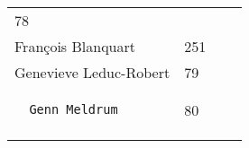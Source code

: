 \documentclass[]{article}
\begin{document}
\begin{longtable}[c]{@{}llll@{}}
\begin{minipage}[t]{0.10\columnwidth}
78
\end{minipage} & \begin{minipage}[t]{0.13\columnwidth}\raggedright
\end{minipage} & \begin{minipage}[t]{0.15\columnwidth}\raggedright
\end{minipage}
\\\noalign{\medskip}
\begin{minipage}[t]{0.39\columnwidth}\raggedright
Fran\c{c}ois Blanquart
\end{minipage} & \begin{minipage}[t]{0.10\columnwidth}\raggedright
251
\end{minipage} & \begin{minipage}[t]{0.13\columnwidth}\raggedright
\end{minipage} & \begin{minipage}[t]{0.15\columnwidth}\raggedright
\end{minipage}
\\\noalign{\medskip}
\begin{minipage}[t]{0.39\columnwidth}\raggedright
Genevieve Leduc-Robert
\end{minipage} & \begin{minipage}[t]{0.10\columnwidth}\raggedright
79
\end{minipage} & \begin{minipage}[t]{0.13\columnwidth}\raggedright
\end{minipage} & \begin{minipage}[t]{0.15\columnwidth}\raggedright
\end{minipage}
\\\noalign{\medskip}
\begin{minipage}[t]{0.39\columnwidth}\raggedright
\begin{verbatim}
  Genn Meldrum
\end{verbatim}
\end{minipage} & \begin{minipage}[t]{0.10\columnwidth}\raggedright
80
\end{minipage} & \begin{minipage}[t]{0.13\columnwidth}\raggedright
\end{minipage} & \begin{minipage}[t]{0.15\columnwidth}\raggedright
\end{minipage}
\\\noalign{\medskip}
\begin{minipage}[t]{0.39\columnwidth}\raggedright

\end{minipage}
\end{longtable}
\end{document}
